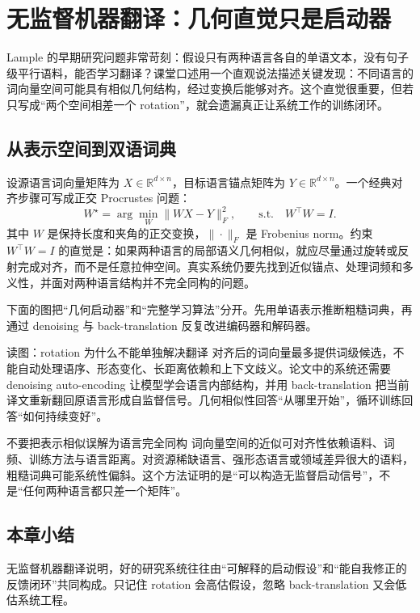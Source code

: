 \section{无监督机器翻译：几何直觉只是启动器}

Lample 的早期研究问题非常苛刻：假设只有两种语言各自的单语文本，没有句子级平行语料，能否学习翻译？课堂口述用一个直观说法描述关键发现：不同语言的词向量空间可能具有相似几何结构，经过变换后能够对齐。这个直觉很重要，但若只写成“两个空间相差一个 rotation”，就会遗漏真正让系统工作的训练闭环。

\subsection{从表示空间到双语词典}

设源语言词向量矩阵为 $X\in\mathbb{R}^{d\times n}$，目标语言锚点矩阵为 $Y\in\mathbb{R}^{d\times n}$。一个经典对齐步骤可写成正交 Procrustes 问题：
\[
W^{\star}=\arg\min_{W}\|WX-Y\|_{F}^{2},
\qquad \text{s.t.}\quad W^{\top}W=I.
\]
其中 $W$ 是保持长度和夹角的正交变换，$\|\cdot\|_{F}$ 是 Frobenius norm。约束 $W^{\top}W=I$ 的直觉是：如果两种语言的局部语义几何相似，就应尽量通过旋转或反射完成对齐，而不是任意拉伸空间。真实系统仍要先找到近似锚点、处理词频和多义性，并面对两种语言结构并不完全同构的问题。

下面的图把“几何启动器”和“完整学习算法”分开。先用单语表示推断粗糙词典，再通过 denoising 与 back-translation 反复改进编码器和解码器。


\begin{knowledgebox}{读图：rotation 为什么不能单独解决翻译}
对齐后的词向量最多提供词级候选，不能自动处理语序、形态变化、长距离依赖和上下文歧义。论文中的系统还需要 denoising auto-encoding 让模型学会语言内部结构，并用 back-translation 把当前译文重新翻回原语言形成自监督信号。几何相似性回答“从哪里开始”，循环训练回答“如何持续变好”。
\end{knowledgebox}

\begin{warningbox}{不要把表示相似误解为语言完全同构}
词向量空间的近似可对齐性依赖语料、词频、训练方法与语言距离。对资源稀缺语言、强形态语言或领域差异很大的语料，粗糙词典可能系统性偏斜。这个方法证明的是“可以构造无监督启动信号”，不是“任何两种语言都只差一个矩阵”。
\end{warningbox}


\subsection{本章小结}

无监督机器翻译说明，好的研究系统往往由“可解释的启动假设”和“能自我修正的反馈闭环”共同构成。只记住 rotation 会高估假设，忽略 back-translation 又会低估系统工程。

